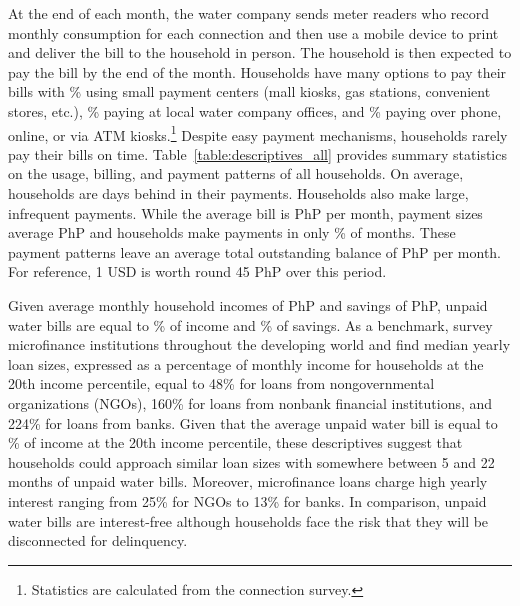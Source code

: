 \documentclass[12pt]{article}
\begin{document}
At the end of each month, the water company sends meter readers who record monthly consumption for each connection and then use a mobile device to print and deliver the bill to the household in person.  The household is then expected to pay the bill by the end of the month.  Households have many options to pay their bills with \unskip\% using small payment centers (mall kiosks, gas stations, convenient stores, etc.), \unskip\% paying at local water company offices, and \unskip\% paying over phone, online, or via ATM kiosks.\footnote{Statistics are calculated from the connection survey.}  Despite easy payment mechanisms, households rarely pay their bills on time.  Table~\ref{table:descriptives_all} provides summary statistics on the usage, billing, and payment patterns of all households.  On average, households are days behind in their payments.  Households also make large, infrequent payments.  While the average bill is PhP per month, payment sizes average PhP and households make payments in only \unskip\% of months.  These payment patterns leave an average total outstanding balance of PhP per month.  For reference, 1 USD is worth round 45 PhP over this period.

Given average monthly household incomes of PhP and savings of PhP, unpaid water bills are equal to \unskip\% of income and \unskip\% of savings.  As a benchmark, \cite{cull2009microfinance} survey microfinance institutions throughout the developing world and find median yearly loan sizes, expressed as a percentage of monthly income for households at the 20th income percentile, equal to 48\% for loans from nongovernmental organizations (NGOs), 160\% for loans from nonbank financial institutions, and 224\% for loans from banks.  Given that the average unpaid water bill is equal to \unskip\% of income at the 20th income percentile, these descriptives suggest that households could approach similar loan sizes with somewhere between 5 and 22 months of unpaid water bills.   Moreover, microfinance loans charge high yearly interest ranging from 25\% for NGOs to 13\% for banks.  In comparison, unpaid water bills are interest-free although households face the risk that they will be disconnected for delinquency. %
\end{document}
